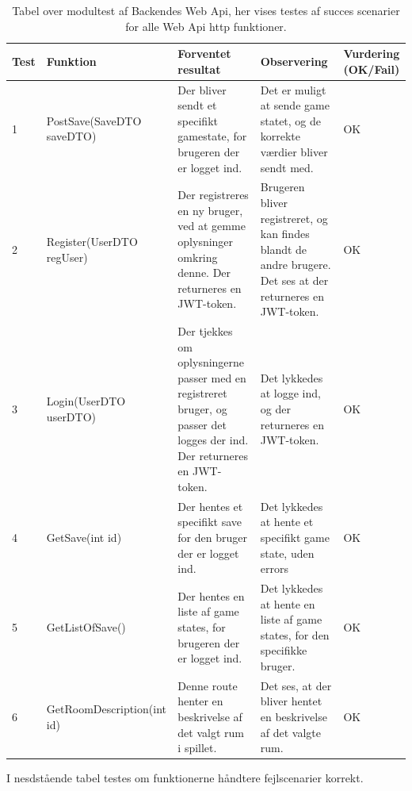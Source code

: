 \begin{table}[H]
\caption{Tabel over modultest af Backendes Web Api, her vises testes af succes scenarier for alle Web Api http funktioner. }%
\label{table: succes}
\begin{tabular}{|p{0.75cm}|p{3.6cm}|p{3.5cm}|p{3.5cm}|p{1.9cm}|} \hline
 \textbf{Test} & \textbf{Funktion} & \textbf{Forventet resultat} & \textbf{Observering} & \textbf{Vurdering} \textbf{(OK/Fail)}\\\hline
 1 & PostSave(SaveDTO saveDTO) & Der bliver sendt et specifikt gamestate, for brugeren der er logget ind. & Det er muligt at sende game statet, og de korrekte værdier bliver sendt med. & OK \\ \hline
 2 & Register(UserDTO regUser) & Der registreres en ny bruger, ved at gemme oplysninger omkring denne. Der returneres en JWT-token. & Brugeren bliver registreret, og kan findes blandt de andre brugere. Det ses at der returneres en JWT-token. & OK \\ \hline
 3 & Login(UserDTO userDTO) & Der tjekkes om oplysningerne passer med en registreret bruger, og passer det logges der ind. Der returneres en JWT-token. & Det lykkedes at logge ind, og der returneres en JWT-token.  & OK \\ \hline
 4 & GetSave(int id) & Der hentes et specifikt save for den bruger der er logget ind. & Det lykkedes at hente et specifikt game state, uden errors  & OK \\ \hline
 5 & GetListOfSave() & Der hentes en liste af game states, for brugeren der er logget ind. & Det lykkedes at hente en liste af game states, for den specifikke bruger. & OK \\ \hline
 6 & GetRoomDescription(int id) & Denne route henter en beskrivelse af det valgt rum i spillet. & Det ses, at der bliver hentet en beskrivelse af det valgte rum. & OK \\ \hline
\end{tabular}
\end{table}

I nesdstående tabel \label{table: fejl} testes om funktionerne håndtere fejlscenarier korrekt.

